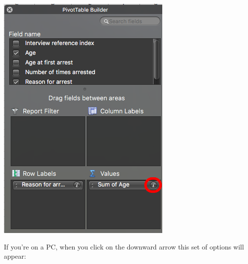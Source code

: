 \documentclass[]{book}
\theoremstyle{definition}
\theoremstyle{definition}
\theoremstyle{definition}
\theoremstyle{remark}
\begin{document}
\includegraphics{imgs/change_from_sum.png}

If you're on a PC, when you click on the downward arrow this set of
options will appear:
\end{document}

